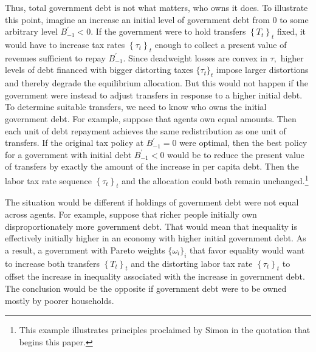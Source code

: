 \documentclass[thmsb,11pt]{article}
\begin{document}
Thus, total government debt is not what matters, who owns it does.
To  illustrate this point,
imagine an increase an
initial level of government debt from $0$ to some arbitrary level $%
B_{-1}^{\prime } < 0$. If the government were to hold transfers $\left\{ T_{t}\right\} _{t}$ fixed, it would
 have  to increase  tax rates $\left\{ \tau
_{t}\right\} _{t}$ enough to collect a present value of revenues sufficient to
repay $B_{-1}^{\prime }$. Since deadweight losses are convex in $\tau ,$
higher levels of debt financed with bigger distorting taxes $\{\tau_t\}_t$  impose larger
distortions and thereby degrade the equilibrium allocation.  But this would not happen  if
the government were instead  to adjust transfers in response to a higher initial debt. To determine suitable transfers, we need to
know who owns  the initial government debt. For example, suppose that agents own equal amounts. Then
each unit of debt repayment achieves the same redistribution as one
unit of transfers. If the original tax policy  at $B_{-1}^{\prime } =0 $ were optimal, then  the best policy for a government with  initial debt $%
B_{-1}^{\prime } <0 $ would be to reduce the present value of  transfers by exactly the amount of the
increase in per capita debt. Then the labor  tax rate sequence  $\left\{ \tau
_{t}\right\}_t $ and the allocation could both remain unchanged.\footnote{This example illustrates
principles proclaimed by Simon \citet[p. 85]{newcomb1865critical} in the quotation that begins
 this paper.}


The situation would be different if  holdings of government
debt were not equal across agents. For example, suppose  that  richer people initially  own disproportionately more government debt. That would mean that inequality
is  effectively initially  higher in an economy with higher initial government debt. As a result, a
government with Pareto weights $\{\omega_i\}_i$ that favor equality would want to increase both   transfers $\left\{ T_{t}\right\}_t $  and the distorting labor  tax rate $\left\{ \tau _{t}\right\}_t$
to offset the increase in inequality
associated with the increase in government debt. The conclusion would be the
opposite if government debt were to be  owned mostly by poorer
households.
\end{document}
